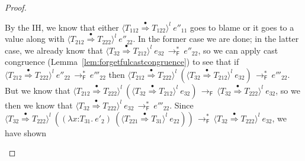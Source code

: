 \documentclass[9pt]{extarticle}
\newcommand{\ottnt}[1]{\mathit{#1}}
\begin{document}
{\begin{lemma}
\begin{proof}
{\begin{itemize}
\begin{itemize}
        By the IH, we know that either $ \langle  \ottnt{T_{{\mathrm{112}}}}  \mathord{ \overset{\bullet}{\Rightarrow} }  \ottnt{T_{{\mathrm{122}}}}  \rangle^{ \ottnt{l} } ~  \ottnt{e''_{{\mathrm{11}}}} $ goes
        to blame or it goes to a value along with $ \langle  \ottnt{T_{{\mathrm{212}}}}  \mathord{ \overset{\bullet}{\Rightarrow} }  \ottnt{T_{{\mathrm{222}}}}  \rangle^{ \ottnt{l} } ~  \ottnt{e''_{{\mathrm{22}}}} $. In the former case we are done; in the latter case,
        we already know that $ \langle  \ottnt{T_{{\mathrm{32}}}}  \mathord{ \overset{\bullet}{\Rightarrow} }  \ottnt{T_{{\mathrm{212}}}}  \rangle^{ \ottnt{l} } ~  \ottnt{e_{{\mathrm{32}}}}  \,  \longrightarrow ^{*}_{  \mathsf{F}  }  \, \ottnt{e''_{{\mathrm{22}}}}$, so
        we can apply cast congruence
        (Lemma~\ref{lem:forgetfulcastcongruence}) to see that if
        $ \langle  \ottnt{T_{{\mathrm{212}}}}  \mathord{ \overset{\bullet}{\Rightarrow} }  \ottnt{T_{{\mathrm{222}}}}  \rangle^{ \ottnt{l} } ~  \ottnt{e''_{{\mathrm{22}}}}  \,  \longrightarrow ^{*}_{  \mathsf{F}  }  \, \ottnt{e'''_{{\mathrm{22}}}}$ then $ \langle  \ottnt{T_{{\mathrm{212}}}}  \mathord{ \overset{\bullet}{\Rightarrow} }  \ottnt{T_{{\mathrm{222}}}}  \rangle^{ \ottnt{l} } ~   (  \langle  \ottnt{T_{{\mathrm{32}}}}  \mathord{ \overset{\bullet}{\Rightarrow} }  \ottnt{T_{{\mathrm{212}}}}  \rangle^{ \ottnt{l} } ~  \ottnt{e_{{\mathrm{32}}}}  )   \,  \longrightarrow ^{*}_{  \mathsf{F}  }  \, \ottnt{e'''_{{\mathrm{22}}}}$.
But we know that $ \langle  \ottnt{T_{{\mathrm{212}}}}  \mathord{ \overset{\bullet}{\Rightarrow} }  \ottnt{T_{{\mathrm{222}}}}  \rangle^{ \ottnt{l} } ~   (  \langle  \ottnt{T_{{\mathrm{32}}}}  \mathord{ \overset{\bullet}{\Rightarrow} }  \ottnt{T_{{\mathrm{212}}}}  \rangle^{ \ottnt{l} } ~  \ottnt{e_{{\mathrm{32}}}}  )   \,  \longrightarrow _{  \mathsf{F}  }  \,  \langle  \ottnt{T_{{\mathrm{32}}}}  \mathord{ \overset{\bullet}{\Rightarrow} }  \ottnt{T_{{\mathrm{222}}}}  \rangle^{ \ottnt{l} } ~  \ottnt{e_{{\mathrm{32}}}} $, so we then we know that $ \langle  \ottnt{T_{{\mathrm{32}}}}  \mathord{ \overset{\bullet}{\Rightarrow} }  \ottnt{T_{{\mathrm{222}}}}  \rangle^{ \ottnt{l} } ~  \ottnt{e_{{\mathrm{32}}}}  \,  \longrightarrow ^{*}_{  \mathsf{F}  }  \, \ottnt{e'''_{{\mathrm{22}}}}$. Since $ \langle  \ottnt{T_{{\mathrm{32}}}}  \mathord{ \overset{\bullet}{\Rightarrow} }  \ottnt{T_{{\mathrm{222}}}}  \rangle^{ \ottnt{l} } ~   (   (  \lambda \mathit{x} \mathord{:} \ottnt{T_{{\mathrm{31}}}} .~  \ottnt{e'_{{\mathrm{2}}}}  )  ~  (  \langle  \ottnt{T_{{\mathrm{221}}}}  \mathord{ \overset{\bullet}{\Rightarrow} }  \ottnt{T_{{\mathrm{31}}}}  \rangle^{ \ottnt{l} } ~  \ottnt{e_{{\mathrm{22}}}}  )   )   \,  \longrightarrow ^{*}_{  \mathsf{F}  }  \,  \langle  \ottnt{T_{{\mathrm{32}}}}  \mathord{ \overset{\bullet}{\Rightarrow} }  \ottnt{T_{{\mathrm{222}}}}  \rangle^{ \ottnt{l} } ~  \ottnt{e_{{\mathrm{32}}}} $, we have shown

\end{itemize}
\end{itemize}}
\end{proof}
\end{lemma}}
\end{document}
